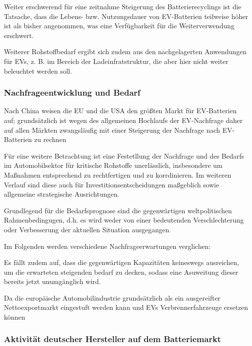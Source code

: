 \documentclass[12pt,a4paper,oneside]{book} %
\begin{document}
{{Weiter erschwerend für eine zeitnahme Steigerung des Batterierecyclings ist die Tatsache, dass die Lebens- bzw. Nutzungsdauer von EV-Batterien teilweise höher ist als bisher angenommen,\autocite{FT: EV batteries last longer than drivers feared, 02.09.2026} was eine Verfügbarkeit für die Weiterverwendung erschwert.

Weiterer Rohstoffbedarf ergibt sich zudem aus den nachgelagerten Anwendungen für EVs, z. B. im Bereich der Ladeinfratstruktur,\autocite{IEA, 2021} die aber hier nicht weiter beleuchtet werden soll.


\subsubsection{Nachfrageentwicklung und Bedarf}

Nach China weisen die EU und die USA den größten Markt für EV-Batterien auf; grundsätzlich ist wegen des allgemeinen Hochlaufs der EV-Nachfrage daher auf allen Märkten zwangsläufig mit einer Steigerung der Nachfrage nach EV-Batterien zu rechnen

Für eine weitere Betrachtung ist eine Festetllung der Nachfrage und des Bedarfs im Automobilsektor für kritische Rohstoffe unerlässlich, insbesondere um Maßnahmen entsprechend zu rechtfertigen und zu korrdinieren. Im weiteren Verlauf sind diese auch für Investitionsentscheidungen maßgeblich sowie allgemeine strategische Ausrichtungen.

Grundlegend für die Bedarfsprognose sind die gegenwärtigen weltpolitischen Rahmenbedingugen, d.h. es wird weder von einer bedeutenden Verschlechterung oder Verbesserung der aktuellen Situation ausgegangen.

Im Folgenden werden verschiedene Nachfrageerwartungen verglichen:



Es fällt zudem auf, dass die gegenwärtigen Kapazitäten keineswegs ausreichen, um die erwarteten steigenden bedarf zu decken, sodass eine Asuweitung dieser bereits jetzt unumgänglich wird.

Da die europäische Automobilindustrie grundsätzlich als ein ausgereifter Nettoexportmarkt eingestuft werden kann und EVs Verbrennerfahrzeuge ersetzen können

\subsubsection{Aktivität deutscher Hersteller auf dem Batteriemarkt}

}}
\end{document}
